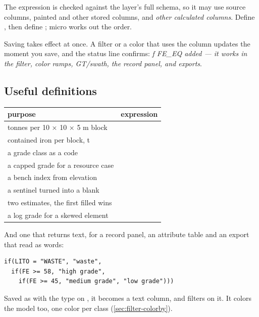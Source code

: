 The expression is checked against the layer's full schema, so it may use source columns, painted and other stored columns, and \emph{other calculated columns}. Define , then define ; micro works out the order.

Saving takes effect at once. A filter or a color that uses the column updates the moment you save, and the status line confirms: \emph{ƒ FE\_EQ added — it works in the filter, color ramps, GT/swath, the record panel, and exports}.

\subsection{Useful definitions}
\begin{center}
\begin{tabularx}{\linewidth}{@{}Ll@{}}\toprule
purpose & expression \\ \midrule
tonnes per 10 × 10 × 5 m block &  \\
contained iron per block, t &  \\
a grade class as a code &  \\
a capped grade for a resource case &  \\
a bench index from elevation &  \\
a sentinel turned into a blank &  \\
two estimates, the first filled wins &  \\
a log grade for a skewed element &  \\ \bottomrule
\end{tabularx}
\end{center}

And one that returns text, for a record panel, an attribute table and an export that read as words:

\begin{lstlisting}[language=expr]
if(LITO = "WASTE", "waste",
  if(FE >= 58, "high grade",
    if(FE >= 45, "medium grade", "low grade")))
\end{lstlisting}

Saved as  with the type on , it becomes a text column, and  filters on it. It colors the model too, one color per class (\cref{sec:filter-colorby}).

